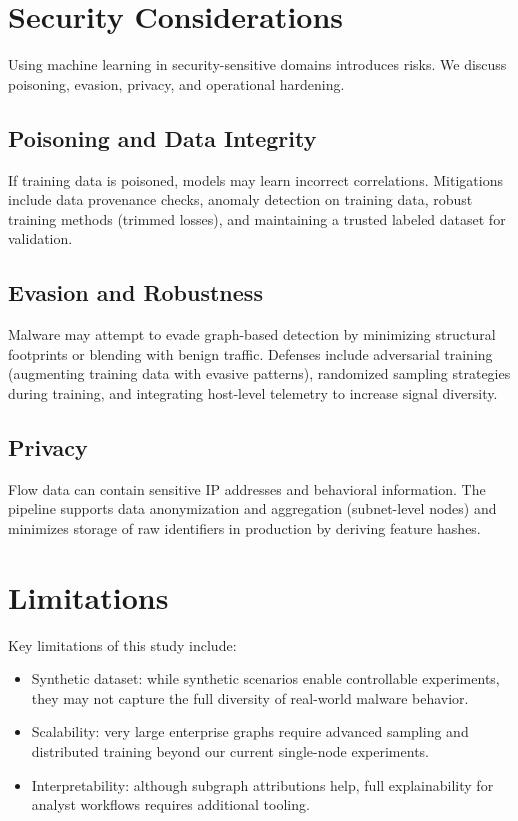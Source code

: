 \documentclass[conference]{IEEEtran}
\begin{document}
\section{Security Considerations}

Using machine learning in security-sensitive domains introduces risks. We discuss poisoning, evasion, privacy, and operational hardening.

\subsection{Poisoning and Data Integrity}

If training data is poisoned, models may learn incorrect correlations. Mitigations include data provenance checks, anomaly detection on training data, robust training methods (trimmed losses), and maintaining a trusted labeled dataset for validation.

\subsection{Evasion and Robustness}

Malware may attempt to evade graph-based detection by minimizing structural footprints or blending with benign traffic. Defenses include adversarial training (augmenting training data with evasive patterns), randomized sampling strategies during training, and integrating host-level telemetry to increase signal diversity.

\subsection{Privacy}

Flow data can contain sensitive IP addresses and behavioral information. The pipeline supports data anonymization and aggregation (subnet-level nodes) and minimizes storage of raw identifiers in production by deriving feature hashes.

\section{Limitations}

Key limitations of this study include:

\begin{itemize}
  \item Synthetic dataset: while synthetic scenarios enable controllable experiments, they may not capture the full diversity of real-world malware behavior.
  \item Scalability: very large enterprise graphs require advanced sampling and distributed training beyond our current single-node experiments.
  \item Interpretability: although subgraph attributions help, full explainability for analyst workflows requires additional tooling.
\end{itemize}
\end{document}
